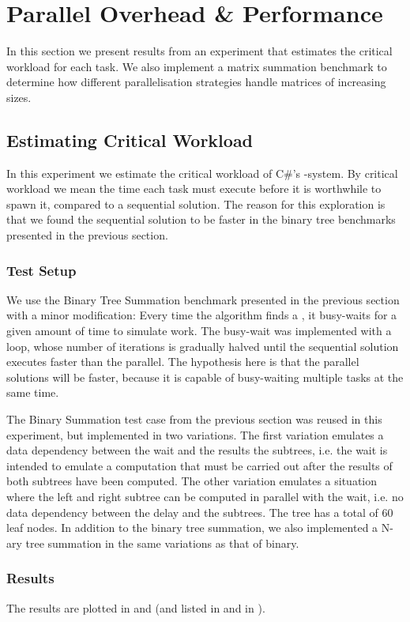 \section{Parallel Overhead \& Performance}\label{sec:crit:work}
In this section we present results from an experiment that estimates the critical workload for each task. We also implement a matrix summation benchmark to determine how different parallelisation strategies handle matrices of increasing sizes.

\subsection{Estimating Critical Workload}
In this experiment we estimate the critical workload of C\#'s -system. By critical workload we mean the time each task must execute before it is worthwhile to spawn it, compared to a sequential solution. The reason for this exploration is that we found the sequential solution to be faster in the binary tree benchmarks presented in the previous section.

\subsubsection{Test Setup}
We use the Binary Tree Summation benchmark presented in the previous section with a minor modification: Every time the algorithm finds a , it busy-waits for a given amount of time to simulate work. The busy-wait was implemented with a loop, whose number of iterations is gradually halved until the sequential solution executes faster than the parallel. The hypothesis here is that the parallel solutions will be faster, because it is capable of busy-waiting multiple tasks at the same time. 

The Binary Summation test case from the previous section was reused in this experiment, but implemented in two variations. The first variation emulates a data dependency between the wait and the results the subtrees, i.e. the wait is intended to emulate a computation that must be carried out after the results of both subtrees have been computed. The other variation emulates a situation where the left and right subtree can be computed in parallel with the wait, i.e. no data dependency between the delay and the subtrees. The tree has a total of 60 leaf nodes. In addition to the binary tree summation, we also implemented a N-ary tree summation in the same variations as that of binary.

\subsubsection{Results}
The results are plotted in  and  (and listed in  and  in ).

